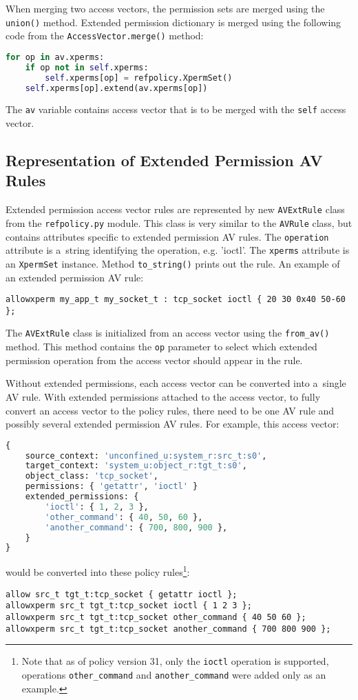 When merging two access vectors, the permission sets are merged using the
\texttt{union()} method. Extended permission dictionary is merged using the
following code from the \texttt{AccessVector.merge()} method:
\begin{lstlisting}[language=Python]
for op in av.xperms:
    if op not in self.xperms:
        self.xperms[op] = refpolicy.XpermSet()
    self.xperms[op].extend(av.xperms[op])
\end{lstlisting}
The \texttt{av} variable contains access vector that is to be merged with
the \texttt{self} access vector.

\subsection{Representation of Extended Permission AV Rules}
Extended permission access vector rules are represented by new
\texttt{AVExtRule} class from the \texttt{refpolicy.py} module. This class is
very similar to the \texttt{AVRule} class, but contains attributes specific to
extended permission AV rules. The \texttt{operation} attribute is a~string
identifying the operation, e.g. 'ioctl'. The \texttt{xperms} attribute is an
\texttt{XpermSet} instance. Method \texttt{to\_string()} prints out the rule.
An example of an extended permission AV rule:
\begin{lstlisting}
allowxperm my_app_t my_socket_t : tcp_socket ioctl { 20 30 0x40 50-60 };
\end{lstlisting}

The \texttt{AVExtRule} class is initialized from an access vector using the
\texttt{from\_av()} method. This method contains the \texttt{op} parameter to
select which extended permission operation from the access vector should appear
in the rule.

Without extended permissions, each access vector can be converted into a~single
AV rule. With extended permissions attached to the access vector, to fully
convert an access vector to the policy rules, there need to be one AV rule and
possibly several extended permission AV rules. For example, this access vector:

\begin{lstlisting}[language=Python]
{
    source_context: 'unconfined_u:system_r:src_t:s0',
    target_context: 'system_u:object_r:tgt_t:s0',
    object_class: 'tcp_socket',
    permissions: { 'getattr', 'ioctl' }
    extended_permissions: {
        'ioctl': { 1, 2, 3 },
        'other_command': { 40, 50, 60 },
        'another_command': { 700, 800, 900 },
    }
}
\end{lstlisting}
would be converted into these policy rules\footnote{Note that as of policy
version 31, only the \texttt{ioctl} operation is supported, operations
\texttt{other\_command} and \texttt{another\_command} were added only as an
example.}:
\begin{lstlisting}
allow src_t tgt_t:tcp_socket { getattr ioctl };
allowxperm src_t tgt_t:tcp_socket ioctl { 1 2 3 };
allowxperm src_t tgt_t:tcp_socket other_command { 40 50 60 };
allowxperm src_t tgt_t:tcp_socket another_command { 700 800 900 };
\end{lstlisting}

